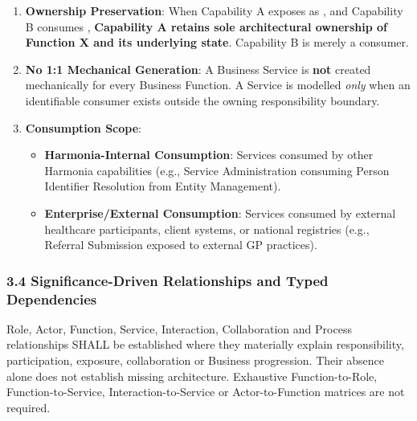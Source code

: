 \begin{enumerate}

\item
\textbf{Ownership Preservation}: When Capability A exposes \texttt{} as \texttt{}, and Capability B consumes \texttt{}, \textbf{Capability A retains sole architectural ownership of Function X and its underlying state}. Capability B is merely a consumer.



\item
\textbf{No 1:1 Mechanical Generation}: A Business Service is \textbf{not} created mechanically for every Business Function. A Service is modelled \emph{only} when an identifiable consumer exists outside the owning responsibility boundary.



\item
\textbf{Consumption Scope}:


\begin{itemize}

\item
\textbf{Harmonia-Internal Consumption}: Services consumed by other Harmonia capabilities (e.g., Service Administration consuming Person Identifier Resolution from Entity Management).



\item
\textbf{Enterprise/\allowbreak{}External Consumption}: Services consumed by external healthcare participants, client systems, or national registries (e.g., Referral Submission exposed to external GP practices).



\end{itemize}


\end{enumerate}
\label{rad:metamodel:155}
\subsubsection*{3.4 Significance-Driven Relationships and Typed Dependencies}
\label{rad:metamodel:157}

Role, Actor, Function, Service, Interaction, Collaboration and Process relationships SHALL be established where they materially explain responsibility, participation, exposure, collaboration or Business progression. Their absence alone does not establish missing architecture. Exhaustive Function-to-Role, Function-to-Service, Interaction-to-Service or Actor-to-Function matrices are not required.

